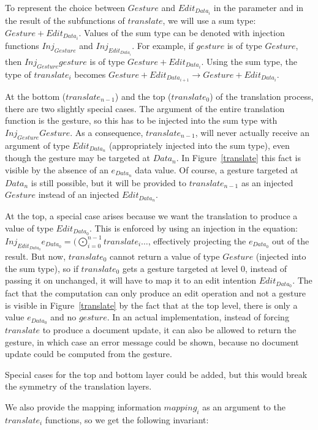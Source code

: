 \documentclass[twoside,epsf]{report}
\begin{document}
To represent the choice between $Gesture$ and $Edit_{Data_i}$ in the parameter and in the result of the subfunctions of $translate$, we will use a sum type: $Gesture+Edit_{Data_i}$. Values of the sum type can be denoted with injection functions $Inj_{Gesture}$ and $Inj_{Edit_{Data_i}}$. For example, if $gesture$ is of type $Gesture$, then $Inj_{Gesture} gesture$ is of type $Gesture + Edit_{Data_i}$. Using the sum type, the type of $translate_i$ becomes $Gesture+Edit_{Data_{i+1}} \rightarrow Gesture+Edit_{Data_i}$. 

At the bottom ($translate_{n-1}$) and the top ($translate_0$) of the translation process, there are two slightly special cases. The argument of the entire translation function is the gesture, so this has to be injected into the sum type with $Inj_{Gesture} Gesture$. As a consequence, $translate_{n-1}$, will never actually receive an argument of type $Edit_{Data_n}$ (appropriately injected into the sum type), even though the gesture may be targeted at $Data_n$. In Figure~\ref{translate} this fact is visible by the absence of an $e_{Data_n}$ data value. Of course, a gesture targeted at $Data_n$ is still possible, but it will be provided to $translate_{n-1}$ as an injected $Gesture$ instead of an injected $Edit_{Data_n}$.

At the top, a special case arises because we want the translation to produce a value of type $Edit_{Data_0}$. This is enforced by using an injection in the equation: $Inj_{Edit_{Data_0}} e_{Data_0} = (\bigodot_{i=0}^{n-1} translate_i \dots$, effectively projecting the $e_{Data_0}$ out of the result. But now, $translate_0$ cannot return a value of type $Gesture$ (injected into the sum type), so if $translate_0$ gets a gesture targeted at level $0$, instead of passing it on unchanged, it will have to map it to an edit intention $Edit_{Data_0}$. The fact that the computation can only produce an edit operation and not a gesture is visible in Figure~\ref{translate} by the fact that at the top level, there is only a value $e_{Data_0}$ and no $gesture$. In an actual implementation, instead of forcing $translate$ to produce a document update, it can also be allowed to return the gesture, in which case an error message could be shown, because no document update could be computed from the gesture.

Special cases for the top and bottom layer could be added, but this would break the symmetry of the translation layers.

We also provide the mapping information $mapping_i$ as an argument to the $translate_i$ functions, so we get the following invariant: 
\end{document}
